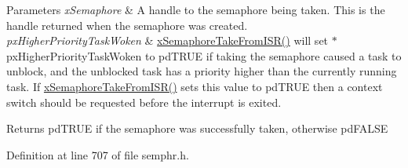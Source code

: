 \begin{DoxyParams}{Parameters}
{\em x\+Semaphore} & A handle to the semaphore being taken. This is the handle returned when the semaphore was created.\\
\hline
{\em px\+Higher\+Priority\+Task\+Woken} & \hyperlink{group___semaphores_ga076419b58e072655686939016e7ca3c5}{x\+Semaphore\+Take\+From\+I\+S\+R()} will set $\ast$px\+Higher\+Priority\+Task\+Woken to pd\+T\+R\+UE if taking the semaphore caused a task to unblock, and the unblocked task has a priority higher than the currently running task. If \hyperlink{group___semaphores_ga076419b58e072655686939016e7ca3c5}{x\+Semaphore\+Take\+From\+I\+S\+R()} sets this value to pd\+T\+R\+UE then a context switch should be requested before the interrupt is exited.\\
\hline
\end{DoxyParams}
\begin{DoxyReturn}{Returns}
pd\+T\+R\+UE if the semaphore was successfully taken, otherwise pd\+F\+A\+L\+SE 
\end{DoxyReturn}


Definition at line 707 of file semphr.\+h.

